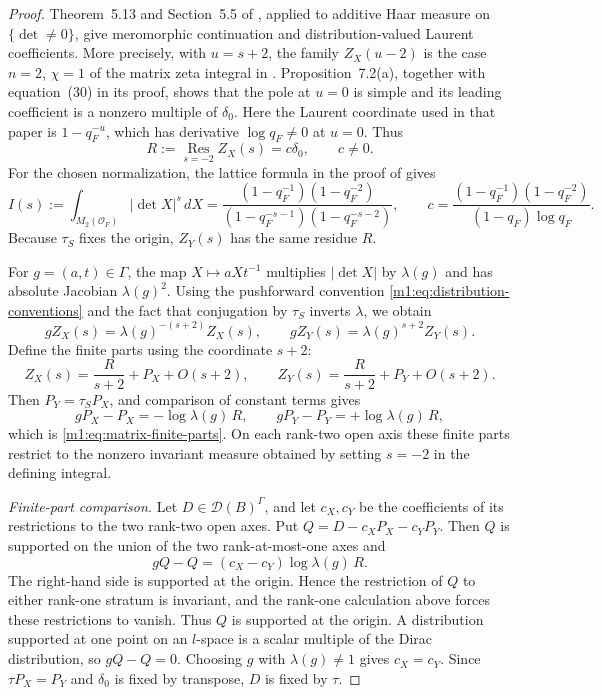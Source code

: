 \begin{proof}
Theorem~5.13 and Section~5.5 of \cite{HongSun2016}, applied to additive
Haar measure on $\{\det\ne0\}$, give meromorphic continuation and
distribution-valued Laurent coefficients. More precisely, with
$u=s+2$, the family $Z_X(u-2)$ is the case $n=2$, $\chi=1$ of the
matrix zeta integral in \cite[Section~7]{HongSun2016}.
Proposition~7.2(a), together with equation~(30) in its proof, shows that
the pole at $u=0$ is simple and its leading coefficient is a nonzero
multiple of $\delta_0$. Here the Laurent coordinate used in that paper
is $1-q_F^{-u}$, which has derivative $\log q_F\ne0$ at $u=0$.
Thus
\[
 R:=\operatorname*{Res}_{s=-2}Z_X(s)=c\delta_0,\qquad c\ne0.
\]
For the chosen normalization, the lattice formula in the proof of
\cite[Proposition~7.2]{HongSun2016} gives
\[
 I(s):=\int_{M_2(\mathcal O_F)}|\det X|^s\,dX
 =\frac{(1-q_F^{-1})(1-q_F^{-2})}
        {(1-q_F^{-s-1})(1-q_F^{-s-2})},
 \qquad
 c=\frac{(1-q_F^{-1})(1-q_F^{-2})}
        {(1-q_F)\log q_F}.
\]
Because $\tau_S$ fixes the origin, $Z_Y(s)$ has the same residue $R$.

For $g=(a,t)\in\Gamma$, the map $X\mapsto aXt^{-1}$ multiplies
$|\det X|$ by $\lambda(g)$ and has absolute Jacobian $\lambda(g)^2$.
Using the pushforward convention \eqref{m1:eq:distribution-conventions}
and the fact that conjugation by $\tau_S$ inverts $\lambda$, we obtain
\[
 gZ_X(s)=\lambda(g)^{-(s+2)}Z_X(s),\qquad
 gZ_Y(s)=\lambda(g)^{s+2}Z_Y(s).
\]
Define the finite parts using the coordinate $s+2$:
\[
 Z_X(s)=\frac{R}{s+2}+P_X+O(s+2),\qquad
 Z_Y(s)=\frac{R}{s+2}+P_Y+O(s+2).
\]
Then $P_Y=\tau_S P_X$, and comparison of constant terms gives
\[
 gP_X-P_X=-\log\lambda(g)\,R,\qquad
 gP_Y-P_Y=+\log\lambda(g)\,R,
\]
which is \eqref{m1:eq:matrix-finite-parts}.
On each rank-two open axis these finite parts restrict to the nonzero
invariant measure obtained by setting $s=-2$ in the defining integral.


\emph{Finite-part comparison.} Let $D\in\mathcal D(B)^\Gamma$, and let $c_X,c_Y$ be the coefficients of its
restrictions to the two rank-two open axes.  Put \(Q=D-c_XP_X-c_YP_Y\). Then $Q$ is supported on the
union of the two rank-at-most-one axes and
\[
    gQ-Q=(c_X-c_Y)\log\lambda(g)\,R.
\]
The right-hand side is supported at the origin.  Hence the restriction of
$Q$ to either rank-one stratum is invariant, and the rank-one
calculation above forces these restrictions to vanish.  Thus $Q$ is supported
at the origin.  A distribution supported at one point on an $l$-space is a
scalar multiple of the Dirac distribution, so $gQ-Q=0$.  Choosing $g$ with
$\lambda(g)\neq1$ gives $c_X=c_Y$.  Since $\tau P_X=P_Y$ and $\delta_0$ is
fixed by transpose, $D$ is fixed by $\tau$.
\end{proof}

